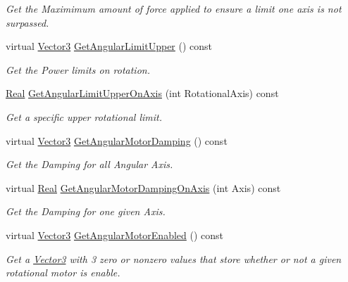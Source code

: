 \begin{DoxyCompactItemize}
\begin{DoxyCompactList}\small\item\em Get the Maximimum amount of force applied to ensure a limit one axis is not surpassed. \item\end{DoxyCompactList}\item 
virtual \hyperlink{classMezzanine_1_1Vector3}{Vector3} \hyperlink{classMezzanine_1_1Generic6DofConstraint_a5899d2668fe8ab1c4ec3310d1679082e}{GetAngularLimitUpper} () const 
\begin{DoxyCompactList}\small\item\em Get the Power limits on rotation. \item\end{DoxyCompactList}\item 
\hyperlink{namespaceMezzanine_a726731b1a7df72bf3583e4a97282c6f6}{Real} \hyperlink{classMezzanine_1_1Generic6DofConstraint_abd364ebc562646bb46b2b003a54d6ca4}{GetAngularLimitUpperOnAxis} (int RotationalAxis) const 
\begin{DoxyCompactList}\small\item\em Get a specific upper rotational limit. \item\end{DoxyCompactList}\item 
virtual \hyperlink{classMezzanine_1_1Vector3}{Vector3} \hyperlink{classMezzanine_1_1Generic6DofConstraint_aa623d540221586a7cad7080e7404282a}{GetAngularMotorDamping} () const 
\begin{DoxyCompactList}\small\item\em Get the Damping for all Angular Axis. \item\end{DoxyCompactList}\item 
virtual \hyperlink{namespaceMezzanine_a726731b1a7df72bf3583e4a97282c6f6}{Real} \hyperlink{classMezzanine_1_1Generic6DofConstraint_a5910bdd1869a1e4580389ac66c769710}{GetAngularMotorDampingOnAxis} (int Axis) const 
\begin{DoxyCompactList}\small\item\em Get the Damping for one given Axis. \item\end{DoxyCompactList}\item 
virtual \hyperlink{classMezzanine_1_1Vector3}{Vector3} \hyperlink{classMezzanine_1_1Generic6DofConstraint_a5d69240a3ded30c0ef0312313667eccf}{GetAngularMotorEnabled} () const 
\begin{DoxyCompactList}\small\item\em Get a \hyperlink{classMezzanine_1_1Vector3}{Vector3} with 3 zero or nonzero values that store whether or not a given rotational motor is enable. \item\end{DoxyCompactList}\item 

\end{DoxyCompactItemize}
